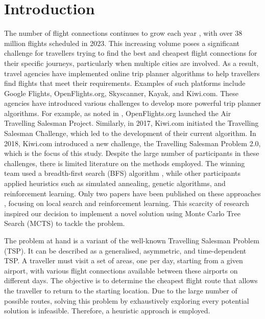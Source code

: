 \section{Introduction}

The number of flight connections continues to grow each year \cite{statista_flights_year}, with over 38 million flights scheduled in 2023. This increasing volume poses a significant challenge for travellers trying to find the best and cheapest flight connections for their specific journeys, particularly when multiple cities are involved. As a result, travel agencies have implemented online trip planner algorithms to help travellers find flights that meet their requirements. Examples of such platforms include Google Flights, OpenFlights.org, Skyscanner, Kayak, and Kiwi.com. 
%
These agencies have introduced various challenges to develop more powerful trip planner algorithms. For example, as noted in \cite{reinforcement_learning_yaro}, OpenFlights.org launched the Air Travelling Salesman Project. Similarly, in 2017, Kiwi.com initiated the Travelling Salesman Challenge, which led to the development of their current algorithm. In 2018, Kiwi.com introduced a new challenge, the Travelling Salesman Problem 2.0, which is the focus of this study. Despite the large number of participants in these challenges, there is limited literature on the methods employed. The winning team used a breadth-first search (BFS) algorithm \cite{tsp2_award}, while other participants applied heuristics such as simulated annealing, genetic algorithms, and reinforcement learning. Only two papers have been published on these approaches \cite{reinforcement_learning_yaro,local_search_yaro}, focusing on local search and reinforcement learning. This scarcity of research inspired our decision to implement a novel solution using Monte Carlo Tree Search (MCTS) to tackle the problem. 

The problem at hand is a variant of the well-known Travelling Salesman Problem (TSP). It can be described as a generalised, asymmetric, and time-dependent TSP. A traveller must visit a set of areas, one per day, starting from a given airport, with various flight connections available between these airports on different days. The objective is to determine the cheapest flight route that allows the traveller to return to the starting location. Due to the large number of possible routes, solving this problem by exhaustively exploring every potential solution is infeasible. Therefore, a heuristic approach is employed. 
